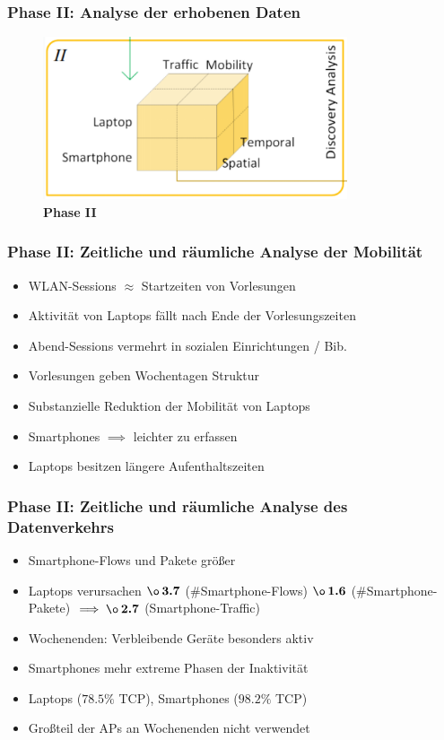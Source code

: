 \documentclass{beamer}
\begin{document}
\begin{frame}
  \frametitle{Phase II: Analyse der erhobenen Daten}
  \begin{figure}
    \centering
    \includegraphics[width=0.8\textwidth]{images/phase2.png}
    \caption*{\textbf{Phase II}}
  \end{figure}  
\end{frame}

\begin{frame}
  \frametitle{Phase II: Zeitliche und räumliche Analyse der Mobilität}
  \begin{itemize}
    \item WLAN-Sessions $\approx$ Startzeiten von Vorlesungen
    \item Aktivität von Laptops fällt nach Ende der Vorlesungszeiten
    \item Abend-Sessions vermehrt in sozialen Einrichtungen / Bib.
    \item Vorlesungen geben Wochentagen Struktur
    \item Substanzielle Reduktion der Mobilität von Laptops
    \item Smartphones  $\implies$ leichter zu erfassen
    \item Laptops besitzen längere Aufenthaltszeiten 
  \end{itemize}
\end{frame}

\begin{frame}
  \frametitle{Phase II: Zeitliche und räumliche Analyse des Datenverkehrs}
  \begin{itemize}
    \item Smartphone-Flows und Pakete größer
    \item Laptops verursachen $\boldsymbol{\o \thinspace 3.7}$ (\#Smartphone-Flows)\newline
    \phantom \quad\quad\quad\quad\quad\quad\quad\quad\thinspace\thinspace\thinspace\thinspace\thinspace $\boldsymbol{\o \thinspace 1.6}$ (\#Smartphone-Pakete)\newline
    \phantom \quad\quad\quad\quad\quad\quad\thinspace\thinspace $\implies \boldsymbol{\o \thinspace 2.7}$ (Smartphone-Traffic)
    \item Wochenenden: Verbleibende Geräte besonders aktiv
    \item Smartphones mehr extreme Phasen der Inaktivität
    \item Laptops ($\boldsymbol{78.5 \%}$ TCP), Smartphones ($\boldsymbol{98.2 \%}$ TCP)
    \item Großteil der APs an Wochenenden nicht verwendet
  \end{itemize}
\end{frame}
\end{document}
